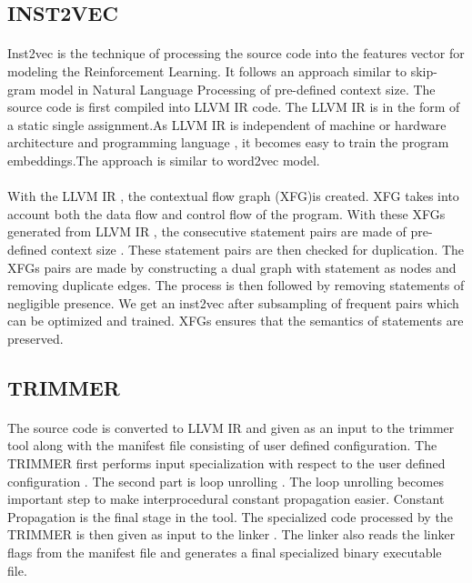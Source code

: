 \documentclass[9pt]{article}
\begin{document}
\subsection{INST2VEC}
\paragraph{}
Inst2vec  is the technique of processing the source code into the features vector for modeling the Reinforcement Learning. It follows an approach similar to skip-gram model in Natural Language Processing of pre-defined context size. The source code is first compiled into LLVM IR code. The LLVM IR is in the form of a static single assignment.As LLVM IR  is independent of machine or hardware architecture and programming language , it becomes easy to train the program embeddings.The approach is similar to word2vec model.

\paragraph{}
With the LLVM IR , the contextual flow graph (XFG)is created. XFG takes into account both the data flow and control flow of the program. With these XFGs generated from LLVM IR , the consecutive statement pairs are made of pre-defined context size . These statement pairs are then  checked for duplication. The XFGs pairs are made by constructing a dual graph with statement as nodes and removing duplicate edges. The process is then followed by removing statements of negligible presence. We get an inst2vec after subsampling of frequent pairs which can be optimized and trained. XFGs ensures that the semantics of statements are preserved.

\subsection{TRIMMER}
\paragraph{}
The source code is converted to LLVM IR  and given as an input to the trimmer tool along with the manifest file consisting of user defined configuration. The TRIMMER first performs input specialization with respect to the user defined configuration . The second part is loop unrolling . The loop unrolling becomes important step to make interprocedural constant propagation easier. Constant Propagation is the final stage in the tool. The specialized code processed by the TRIMMER is then given as input to the linker . The linker also reads the linker flags from the manifest file and generates a final specialized binary executable file.
\end{document}
